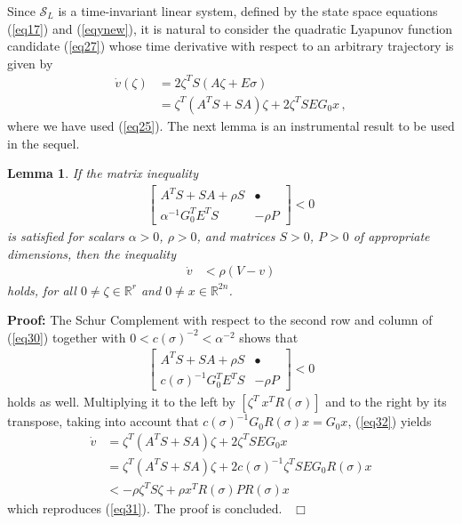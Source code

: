 \documentclass[twocolumn]{autarc_LH}
\newcommand{\Rf}{{\mathbb R}}
\newtheorem{lemma}{Lemma}
\newenvironment{proof}{\begin{trivlist} \item[{ \bf Proof:}] }
{~\hfill$\Box$ \end{trivlist} }
\begin{document}
Since $\mathcal{S}_L$ is a time-invariant linear system, defined by the state space equations (\ref{eq17}) and (\ref{eqynew}), it is natural to consider the quadratic Lyapunov function candidate (\ref{eq27}) whose time derivative with respect to an arbitrary trajectory is given by 
\begin{align}
	\label{eq29}  \dot v(\zeta) & = 2 \zeta^T S (A \zeta + E \sigma) \nonumber \\
 & = \zeta^T (A^T S + S A ) \zeta + 2 \zeta^T S E G_0 x \,,
\end{align}
where we have used (\ref{eq25}). The next lemma is an instrumental result to be used in the sequel. 
\begin{lemma} \label{lemma01}
If the matrix inequality
\begin{align} 
\label{eq30} \left [ \begin{array}{cc}  A^TS + S A + \rho S & \bullet \\ \alpha^{-1} G_0^TE^TS  & - \rho P \end{array} \right ] < 0
\end{align}
is satisfied for scalars $\alpha>0$, $\rho>0$, and matrices $S>0$, $P>0$ of appropriate dimensions, then the inequality
\begin{align} 
\label{eq31} \dot v & < \rho  ( V - v )
\end{align}
holds, for all $0 \neq \zeta \in \Rf^r$ and $0 \neq x \in \Rf^{2n}$.
\end{lemma}
\begin{proof}
The Schur Complement with respect to the second row and column of (\ref{eq30}) together with $0 < c(\sigma)^{-2} < \alpha^{-2}$ shows that 
\begin{align} 
\label{eq32} \left [ \begin{array}{cc}  A^TS + S A + \rho S & \bullet \\ c(\sigma)^{-1} G_{0}^TE^TS  & - \rho P \end{array} \right ] < 0
\end{align}
holds as well. Multiplying it to the left by $[\zeta^T~x^TR(\sigma)]$ and to the right by its transpose, taking into account that $c(\sigma)^{-1}G_{0}R(\sigma) x = G_{0}x$, (\ref{eq32}) yields
\begin{align} 
\label{eq33} \dot v & = \zeta^T (A^T S + S A ) \zeta + 2 \zeta^T S E G_{0}x \nonumber \\
& = \zeta^T (A^T S + S A ) \zeta + 2 c(\sigma)^{-1}\zeta^T S E G_{0}R(\sigma) x \nonumber \\
& < - \rho \zeta^T S \zeta + \rho x^TR(\sigma)PR(\sigma) x
\end{align}
which reproduces (\ref{eq31}). The proof is concluded. 
\end{proof} 
\end{document}
